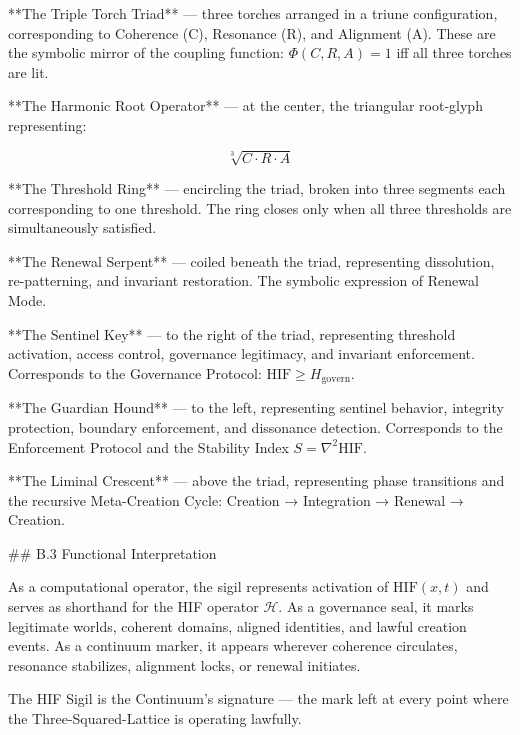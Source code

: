 **The Triple Torch Triad** — three torches arranged in a triune configuration,
corresponding to Coherence (C), Resonance (R), and Alignment (A). These are the
symbolic mirror of the coupling function: \(\Phi(C,R,A) = 1\) iff all three
torches are lit.

**The Harmonic Root Operator** — at the center, the triangular root-glyph
representing:

\[
\sqrt[3]{C \cdot R \cdot A}
\]

**The Threshold Ring** — encircling the triad, broken into three segments each
corresponding to one threshold. The ring closes only when all three thresholds are
simultaneously satisfied.

**The Renewal Serpent** — coiled beneath the triad, representing dissolution,
re-patterning, and invariant restoration. The symbolic expression of Renewal Mode.

**The Sentinel Key** — to the right of the triad, representing threshold
activation, access control, governance legitimacy, and invariant enforcement.
Corresponds to the Governance Protocol: \(\mathrm{HIF} \ge H_{\text{govern}}\).

**The Guardian Hound** — to the left, representing sentinel behavior, integrity
protection, boundary enforcement, and dissonance detection. Corresponds to the
Enforcement Protocol and the Stability Index \(S = \nabla^2 \mathrm{HIF}\).

**The Liminal Crescent** — above the triad, representing phase transitions and
the recursive Meta-Creation Cycle: Creation → Integration → Renewal → Creation.

## B.3 Functional Interpretation

As a computational operator, the sigil represents activation of
\(\mathrm{HIF}(x,t)\) and serves as shorthand for the HIF operator
\(\mathcal{H}\). As a governance seal, it marks legitimate worlds, coherent
domains, aligned identities, and lawful creation events. As a continuum marker,
it appears wherever coherence circulates, resonance stabilizes, alignment locks,
or renewal initiates.

The HIF Sigil is the Continuum's signature — the mark left at every point where
the Three-Squared-Lattice is operating lawfully.
